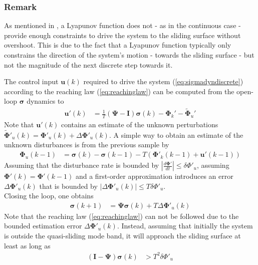 \documentclass{ifacconf}
\providecommand{\mbf}[1]{\mathbf{#1}}
\newcommand{\idxSample}{{\ensuremath{k}}}
\begin{document}
\subsubsection{Remark} As mentioned in \cite{monsees2001discrete}, a Lyapunov function does not - as in the continuous case - provide enough constraints to drive the system to the sliding surface without overshoot. This is due to the fact that a Lyapunov function typically only constrains the direction of the system's motion - towards the sliding surface - but not the magnitude of the next discrete step towards it. 

The control input $\mbf{u}(\idxSample)$ required to drive the system (\ref{eq:sigmadyndiscrete}) according to the reaching law (\ref{eq:reachinglaw}) can be computed from the open-loop $\mbf{\sigma}$ dynamics to
\begin{align}
\mbf{u}'(\idxSample) &= \frac{1}{T}(\mbf{\Psi} - \mbf{I})\mbf{\sigma}(\idxSample) - \mbf{\Phi}_k' - \tilde{\mbf{\Phi}}_u'
\end{align}
Note that $\mbf{u}'(\idxSample)$ contains an estimate of the unknown perturbations $\tilde{\mbf{\Phi}}'_u(\idxSample) = \mbf{\Phi}'_u(\idxSample) + \Delta \mbf{\Phi}'_u(\idxSample)$. 
A simple way to obtain an estimate of the unknown disturbances is from the previous sample by
\begin{align}
\mbf{\Phi}_u(\idxSample-1) &=
\mbf{\sigma}(\idxSample)
-
\mbf{\sigma}(\idxSample-1)
-
T
(\mbf{\Phi}'_k(\idxSample-1) + \mbf{u}'(\idxSample-1))
\end{align}
Assuming that the disturbance rate is bounded by $|\frac{d \mbf{\Phi}'}{dt}| \leq \delta \Phi'_u$, assuming $\mbf{\Phi}'(\idxSample) = \mbf{\Phi}'(\idxSample-1)$ and a first-order approximation introduces an error $\Delta \mbf{\Phi}'_u(\idxSample)$ that is bounded by $|\Delta \mbf{\Phi}'_u(\idxSample)| \leq T \delta \Phi'_u $.\\
Closing the loop, one obtains
\begin{align}
\mbf{\sigma}(\idxSample+1) &= \mbf{\Psi} \mbf{\sigma}(\idxSample) +
T \Delta \mbf{\Phi}'_u(\idxSample)
\end{align}
Note that the reaching law (\ref{eq:reachinglaw}) can not be followed due to the bounded estimation error $\Delta \mbf{\Phi}'_u(\idxSample)$. Instead, assuming that initially the system is outside the quasi-sliding mode band, it will approach the sliding surface at least as long as
\begin{align}
(\mbf{I} - \mbf{\Psi}) \mbf{\sigma}(\idxSample) & > T^2 \delta \Phi'_u
\end{align}
\end{document}
